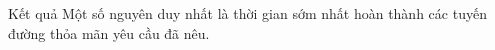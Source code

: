 Kết quả
Một số nguyên duy nhất là thời gian sớm nhất hoàn thành các tuyến đường thỏa mãn yêu cầu đã nêu.